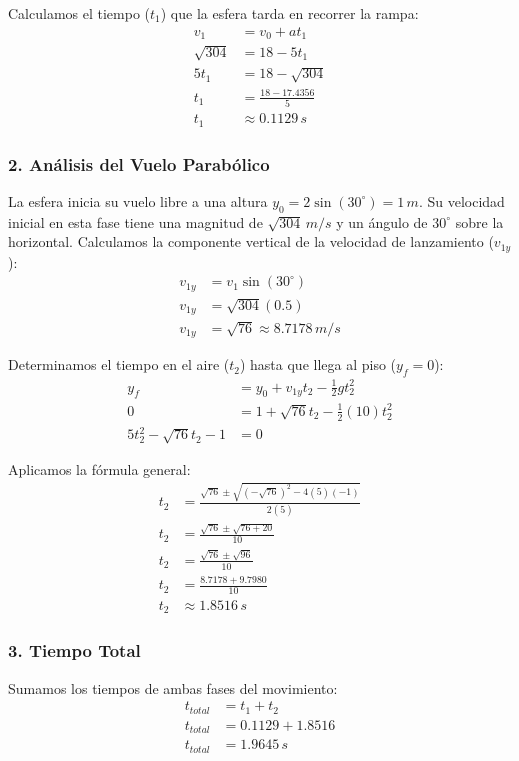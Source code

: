 \documentclass[12pt, a4paper]{article}
\begin{document}
Calculamos el tiempo ($t_1$) que la esfera tarda en recorrer la rampa:
\begin{align*}
v_1 &= v_0 + at_1 \\
\sqrt{304} &= 18 - 5t_1 \\
5t_1 &= 18 - \sqrt{304} \\
t_1 &= \frac{18 - 17.4356}{5} \\
t_1 &\approx 0.1129 \, \si{s}
\end{align*}

\subsubsection*{2. Análisis del Vuelo Parabólico}
La esfera inicia su vuelo libre a una altura $y_0 = 2 \sin(30^\circ) = 1 \, \si{m}$. Su velocidad inicial en esta fase tiene una magnitud de $\sqrt{304} \, \si{m/s}$ y un ángulo de $30^\circ$ sobre la horizontal.
Calculamos la componente vertical de la velocidad de lanzamiento ($v_{1y}$):
\begin{align*}
v_{1y} &= v_1 \sin(30^\circ) \\
v_{1y} &= \sqrt{304} (0.5) \\
v_{1y} &= \sqrt{76} \approx 8.7178 \, \si{m/s}
\end{align*}

Determinamos el tiempo en el aire ($t_2$) hasta que llega al piso ($y_f = 0$):
\begin{align*}
y_f &= y_0 + v_{1y}t_2 - \frac{1}{2}gt_2^2 \\
0 &= 1 + \sqrt{76}t_2 - \frac{1}{2}(10)t_2^2 \\
5t_2^2 - \sqrt{76}t_2 - 1 &= 0
\end{align*}

Aplicamos la fórmula general:
\begin{align*}
t_2 &= \frac{\sqrt{76} \pm \sqrt{(-\sqrt{76})^2 - 4(5)(-1)}}{2(5)} \\
t_2 &= \frac{\sqrt{76} \pm \sqrt{76 + 20}}{10} \\
t_2 &= \frac{\sqrt{76} \pm \sqrt{96}}{10} \\
t_2 &= \frac{8.7178 + 9.7980}{10} \\
t_2 &\approx 1.8516 \, \si{s}
\end{align*}

\subsubsection*{3. Tiempo Total}
Sumamos los tiempos de ambas fases del movimiento:
\begin{align*}
t_{total} &= t_1 + t_2 \\
t_{total} &= 0.1129 + 1.8516 \\
t_{total} &= 1.9645 \, \si{s}
\end{align*}
\end{document}
